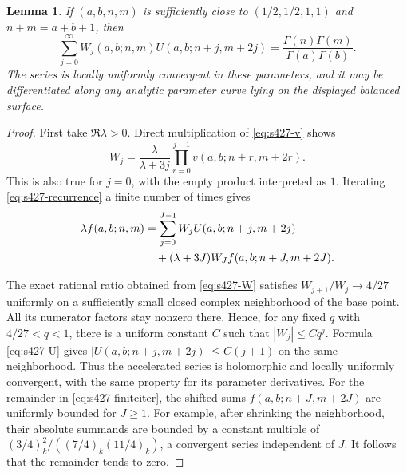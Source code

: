 \documentclass[11pt,a4paper]{article}
\newtheorem{lemma}[theorem]{Lemma}
\theoremstyle{remark}\newtheorem{remark}[theorem]{Remark}
\numberwithin{equation}{section}
\begin{document}
\begin{lemma}\label{lem:s427-residue}
If $(a,b,n,m)$ is sufficiently close to $(1/2,1/2,1,1)$ and
$n+m=a+b+1$, then
\begin{equation}\label{eq:s427-residue}
 \sum_{j=0}^{\infty}W_j(a,b;n,m)
             U(a,b;n+j,m+2j)
 =\frac{\Gamma(n)\Gamma(m)}{\Gamma(a)\Gamma(b)}.
\end{equation}
The series is locally uniformly convergent in these parameters, and
it may be differentiated along any analytic parameter curve lying
on the displayed balanced surface.
\end{lemma}
\begin{proof}
First take $\Re\lambda>0$. Direct multiplication of
\eqref{eq:s427-v} shows
\[
 W_j=\frac{\lambda}{\lambda+3j}
       \prod_{r=0}^{j-1}v(a,b;n+r,m+2r).
\]
This is also true for $j=0$, with the empty product interpreted as $1$.
Iterating \eqref{eq:s427-recurrence} a finite number of times gives
\begin{align}
 \lambda f(a,b;n,m)
 &=\sum_{j=0}^{J-1}W_jU(a,b;n+j,m+2j)\notag\\
 &\quad+(\lambda+3J)W_J f(a,b;n+J,m+2J).
 \label{eq:s427-finiteiter}
\end{align}

The exact rational ratio obtained from \eqref{eq:s427-W} satisfies
$W_{j+1}/W_j\longrightarrow4/27$ uniformly on a sufficiently small
closed complex neighborhood of the base point. All its numerator
factors stay nonzero there. Hence, for any fixed $q$ with
$4/27<q<1$, there is a uniform constant $C$ such that
$|W_j|\le Cq^j$. Formula \eqref{eq:s427-U} gives
$|U(a,b;n+j,m+2j)|\le C(j+1)$ on the same neighborhood.
Thus the accelerated series is holomorphic and locally uniformly
convergent, with the same property for its parameter derivatives.
For the remainder in \eqref{eq:s427-finiteiter}, the shifted sums
$f(a,b;n+J,m+2J)$ are uniformly bounded for $J\ge1$. For example,
after shrinking the neighborhood, their absolute summands are bounded
by a constant multiple of
$(3/4)_k^2/((7/4)_k(11/4)_k)$, a convergent series independent of $J$.
It follows that the remainder tends to zero.


\end{proof}
\end{document}
